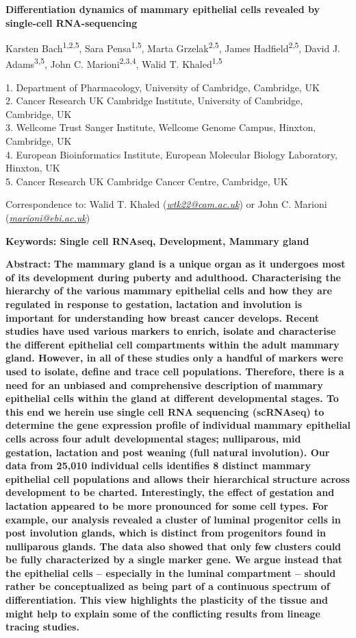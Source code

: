 \documentclass[titlepage, 12pt, oneside]{amsart}
\begin{document}
\begin{titlepage}
\large
\textbf{Differentiation dynamics of mammary epithelial cells revealed by
single-cell RNA-sequencing}
\normalsize

\small
Karsten Bach\textsuperscript{1,2,5}, Sara Pensa\textsuperscript{1,5},
Marta Grzelak\textsuperscript{2,5}, James Hadfield\textsuperscript{2,5},
David J. Adams\textsuperscript{3,5}, John C.
Marioni\textsuperscript{2,3,4}, Walid T. Khaled\textsuperscript{1,5 }

1. Department of Pharmacology, University of Cambridge, Cambridge, UK\\
2. Cancer Research UK Cambridge Institute, University of Cambridge,
Cambridge, UK\\
3. Wellcome Trust Sanger Institute, Wellcome Genome Campus, Hinxton,
Cambridge, UK\\
4. European Bioinformatics Institute, European Molecular Biology
Laboratory, Hinxton, UK\\
5. Cancer Research UK Cambridge Cancer Centre, Cambridge, UK

Correspondence to: Walid T. Khaled
(\href{mailto:wtk22@cam.ac.uk}{\emph{wtk22@cam.ac.uk}}) or John C.
Marioni (\href{mailto:marioni@ebi.ac.uk}{\emph{marioni@ebi.ac.uk}})

\normalsize
\textbf{Keywords: Single cell RNAseq, Development, Mammary gland }
\end{titlepage}
\onehalfspacing
\textbf{Abstract:}
\textbf{The mammary gland is a unique organ as it undergoes most of its development during puberty and adulthood.
Characterising the hierarchy of the various mammary epithelial cells and how they are regulated in response to gestation, lactation and involution is important for understanding how breast cancer develops.
Recent studies have used various markers to enrich, isolate and characterise the different epithelial cell compartments within the adult mammary gland.
However, in all of these studies only a handful of markers were used to isolate, define and trace cell populations.
Therefore, there is a need for an unbiased and comprehensive description of mammary epithelial cells within the gland at different developmental stages.
To this end we herein use single cell RNA sequencing (scRNAseq) to determine the gene expression profile of individual mammary epithelial cells across four adult developmental stages; nulliparous, mid gestation, lactation and post weaning (full natural involution).
Our data from 25,010 individual cells identifies 8 distinct mammary epithelial cell populations and allows their hierarchical structure across development to be charted.
Interestingly, the effect of gestation and lactation appeared to be more pronounced for some cell types.
For example, our analysis revealed a cluster of luminal progenitor cells in post involution glands, which is distinct from progenitors found in nulliparous glands.
The data also showed that only few clusters could be fully characterized by a single marker gene.
We argue instead that the epithelial cells -- especially in the luminal compartment -- should rather be conceptualized as being part of a continuous spectrum of differentiation.
This view highlights the plasticity of the tissue and might help to explain some of the conflicting results from lineage tracing studies.}
\end{document}
